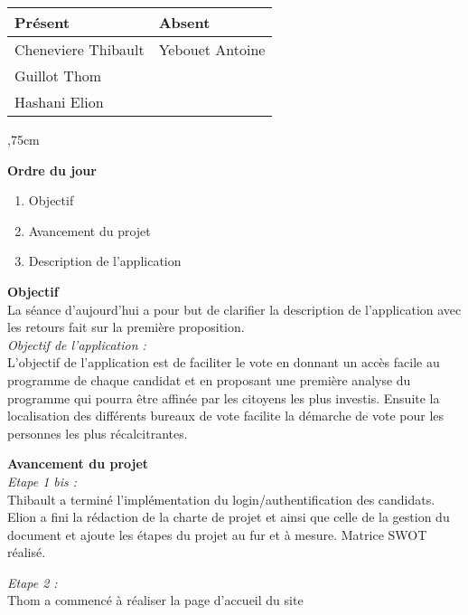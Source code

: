 \vskip 0.75cm

\begin{center}
\begin{tabular}[]{|l|l|}
     \hline 
     Présent & Absent\\
     \hline
     Cheneviere Thibault & Yebouet Antoine\\ 
     Guillot Thom &\\ Hashani Elion &\\
     \hline
\end{tabular}
\end{center}


,75cm

\noindent
\textbf{Ordre du jour}

\begin{enumerate}
    \item Objectif
    \item Avancement du projet
    \item Description de l'application
\end{enumerate}

\vskip 0.25cm

\noindent
\textbf{Objectif}\\
\noindent
La séance d'aujourd'hui a pour but de clarifier la description de l’application avec les retours fait sur la première proposition. \\ 

\noindent
\textit{Objectif de l'application :}\\
L’objectif de l’application est de faciliter le vote en donnant un accès facile au programme de chaque candidat et en proposant une première analyse du programme qui pourra être affinée par les citoyens les plus investis. Ensuite la localisation des différents bureaux de vote facilite la démarche de vote pour les personnes les plus récalcitrantes.

\vskip 0.25cm

\noindent
\textbf{Avancement du projet}\\
\noindent
\textit{Etape 1 bis :} \\
Thibault a terminé l'implémentation du login/authentification des candidats.
\\Elion a fini la rédaction de la charte de projet et ainsi que celle de la gestion du document et ajoute les étapes du projet au fur et à mesure. Matrice SWOT réalisé.

\vskip 0.25cm

\noindent
\textit{Etape 2 :}\\
Thom a commencé à réaliser la page d'accueil du site

